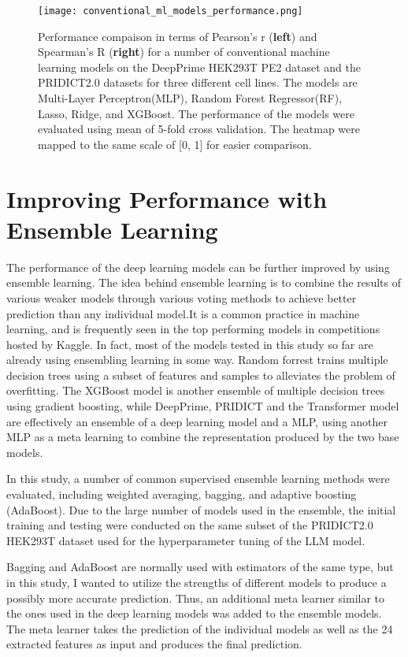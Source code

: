 \begin{figure}
    \centering
    \texttt{[image: conventional\_ml\_models\_performance.png]}
    \caption[Conventional ML model performance comparison]{Performance compaison in terms of Pearson's r (\textbf{left}) and Spearman's R (\textbf{right}) for a number of conventional machine learning models on the DeepPrime HEK293T PE2 dataset and the PRIDICT2.0 datasets for three different cell lines. The models are Multi-Layer Perceptron(MLP), Random Forest Regressor(RF), Lasso, Ridge, and XGBoost. The performance of the models were evaluated using mean of 5-fold cross validation. The heatmap were mapped to the same scale of [0, 1] for easier comparison.}
    \label{fig:conventional_ml_models_performance}
\end{figure}


\section{Improving Performance with Ensemble Learning}

The performance of the deep learning models can be further improved by using ensemble learning. The idea behind ensemble learning is to combine the results of various weaker models through various voting methods to achieve better prediction than any individual model.It is a common practice in machine learning, and is frequently seen in the top performing models in competitions hosted by Kaggle. In fact, most of the models tested in this study so far are already using ensembling learning in some way. Random forrest trains multiple decision trees using a subset of features and samples to alleviates the problem of overfitting. The XGBoost model is another ensemble of multiple decision trees using gradient boosting, while DeepPrime, PRIDICT and the Transformer model are effectively an ensemble of a deep learning model and a MLP, using another MLP as a meta learning to combine the representation produced by the two base models. 

In this study, a number of common supervised ensemble learning methods were evaluated, including weighted averaging, bagging, and adaptive boosting (AdaBoost). Due to the large number of models used in the ensemble, the initial training and testing were conducted on the same subset of the PRIDICT2.0 HEK293T dataset used for the hyperparameter tuning of the LLM model.

Bagging and  AdaBoost are normally used with estimators of the same type, but in this study, I wanted to utilize the strengths of different models to produce a possibly more accurate prediction. Thus, an additional meta learner similar to the ones used in the deep learning models was added to the ensemble models. The meta learner takes the prediction of the individual models as well as the 24 extracted features as input and produces the final prediction.

